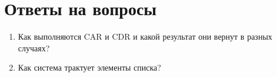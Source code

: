 \newpage
\section*{Ответы на вопросы}
\begin{enumerate}
  \item\Large{Как выполняются CAR и CDR и какой результат они вернут в разных случаях?}
  \item\Large{Как система трактует элементы списка?}
\end{enumerate}

